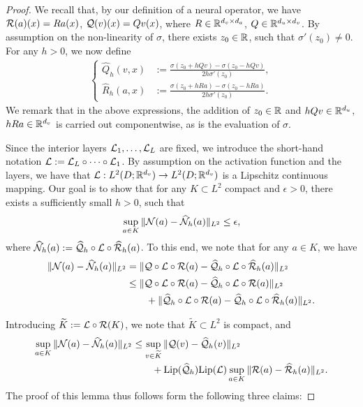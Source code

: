 \documentclass[reqno,a4paper]{amsart}
\begin{document}
\begin{proof}
We recall that, by our definition of a neural operator, we have $\mathcal{R}(a)(x) = Ra(x)$, $\mathcal{Q}(v)(x) = Qv(x)$, where $R\in \mathbb{R}^{d_v\times d_a}$, $Q \in \mathbb{R}^{d_u\times d_v}$. By assumption on the non-linearity of $\sigma$, there exists $z_0 \in \mathbb{R}$, such that $\sigma'(z_0) \ne 0$. For any $h>0$, we now define
\begin{align*}
\left\{
\begin{aligned}
\hat{Q}_h(v,x) 
&:= 
\frac{\sigma(z_0 + h Qv) - \sigma(z_0 - hQv)}{2h \sigma'(z_0)}, 
\\
\hat{R}_h(a,x) 
&:= 
\frac{\sigma(z_0 + h Ra) - \sigma(z_0 - hRa)}{2h \sigma'(z_0)}.
\end{aligned}
\right.
\end{align*}
We remark that in the above expressions, the addition of $z_0 \in \mathbb{R}$ and $hQv\in \mathbb{R}^{d_u}$, $hRa\in \mathbb{R}^{d_v}$ is carried out componentwise, as is the evaluation of $\sigma$. 

Since the interior layers $\mathcal{L}_1,\dots, \mathcal{L}_{L}$ are fixed, we introduce the short-hand notation $\mathcal{L} := \mathcal{L}_{L}\circ \dots \circ \mathcal{L}_{1}$. By assumption on the activation function and the layers, we have that $\mathcal{L}: L^2(D;\mathbb{R}^{d_v}) \to L^2(D;\mathbb{R}^{d_v})$ is a Lipschitz continuous mapping. Our goal is to show that for any $K\subset L^2$ compact and $\epsilon >0$, there exists a sufficiently small $h>0$, such that
\[
\sup_{a\in K} 
\Vert
\mathcal{N}(a) - \widehat{\mathcal{N}}_h(a)
\Vert_{L^2}
\le\epsilon,
\]
where $\widehat{\mathcal{N}}_h(a) := \widehat{\mathcal{Q}}_h \circ \mathcal{L} \circ \widehat{\mathcal{R}}_h(a)$. To this end, we note that for any $a\in K$, we have
\begin{align*}
\Vert
\mathcal{N}(a) - \widehat{\mathcal{N}}_h(a)
\Vert_{L^2}
&=
\Vert
\mathcal{Q}\circ \mathcal{L} \circ \mathcal{R}(a) - \widehat{\mathcal{Q}}_h\circ \mathcal{L} \circ \widehat{\mathcal{R}}_h(a)
\Vert_{L^2}
\\
&\le
\Vert
\mathcal{Q}\circ \mathcal{L} \circ \mathcal{R}(a) - \widehat{\mathcal{Q}}_h\circ \mathcal{L} \circ \mathcal{R}(a)
\Vert_{L^2}
\\
&\qquad +
\Vert
\widehat{\mathcal{Q}}_h\circ \mathcal{L} \circ \mathcal{R}(a) - \widehat{\mathcal{Q}}_h\circ \mathcal{L} \circ \widehat{\mathcal{R}}_h(a)
\Vert_{L^2}.
\end{align*}

Introducing $\widetilde{K} := \mathcal{L} \circ \mathcal{R}(K)$, we note that $\tilde{K} \subset L^2$ is compact, and 
\begin{align*}
\sup_{a\in K} \Vert \mathcal{N}(a) - \widehat{\mathcal{N}}_h(a) \Vert_{L^2}
&\le
\sup_{v\in \widetilde{K}} \Vert \mathcal{Q}(v) - \widehat{\mathcal{Q}}_h(v) \Vert_{L^2}
\\
&\qquad +
\mathrm{Lip}(\widehat{\mathcal{Q}}_h) \mathrm{Lip}(\mathcal{L}) \sup_{a\in K} \Vert \mathcal{R}(a) - \widehat{\mathcal{R}}_h(a) \Vert_{L^2}.
\end{align*}
The proof of this lemma thus follows form the following three claims:


\end{proof}
\end{document}
